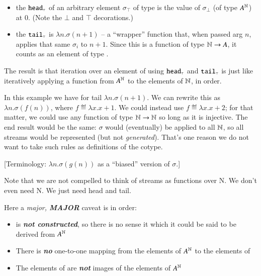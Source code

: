 \begin{itemize}
\item the \(\texttt{\upshape head}_{\scriptscriptstyle\top}\) of an arbitrary element
  \(\sigma_{\scriptscriptstyle{\top}}\) of type  is
  the value of \(\sigma_{\scriptscriptstyle\bot}\) (of type \(A^{\mathbb{N}}\)) at \(0\). (Note the \(\bot\) and \(\top\) decorations.)
\item the \(\texttt{\upshape tail}_{\scriptscriptstyle\top}\) is \(\lambda{}n.\sigma(n+1)\) -- a ``wrapper''
  function that, when passed arg \(n\), applies that same \(\sigma_i\)
  to \(n+1\). Since this is a function of type \(\mathbb{N}\rightarrow{}A\), it
  counts as an element of type .
\end{itemize}

The result is that iteration over an element of 
using \(\texttt{\upshape head}_{\scriptscriptstyle\top}\) and \(\texttt{\upshape tail}_{\scriptscriptstyle\top}\) is just like iteratively applying a function from \(A^{\mathbb{N}}\) to the elements of \(\mathbb{N}\), in order.

In this example we have for tail \(\lambda{}n.\sigma(n+1)\). We can
rewrite this as \(\lambda{}n.\sigma(f(n))\), where
\(f\eqdef\lambda{}x.x+1\). We could instead use
\(f\eqdef\lambda{}x.x+2\); for that matter, we could use any function
of type \(\mathbb{N}\rightarrow{}\mathbb{N}\) so long as it is injective. The end
result would be the same: \(\sigma\) would (eventually) be applied to
all \(\mathbb{N}\), so all streams would be represented (but not
\textit{generated}). That's one reason we do not want to take such
rules as definitions of the cotype.

[Terminology: \(\lambda{}n.\sigma(g(n))\) as a ``biased'' version of
  \(\sigma\).]

\vspace{3ex}

Note that we are not compelled to think of streams as functions over
N. We don't even need N. We just need head and tail.

Here a \textit{major, \textbf{MAJOR}} caveat is in order:

\begin{itemize}
\item {} is \textit{\textbf{not constructed}}, so
  there is no sense it which it could be said to be derived from
  \(A^{\mathbb{N}}\)
\item There is \textit{\textbf{no}} one-to-one mapping from the elements of \(A^{\mathbb{N}}\) to the elements of 
\item The elements of  are \textit{\textbf{not}}
  images of the elements of \(A^{\mathbb{N}}\)
\end{itemize}

